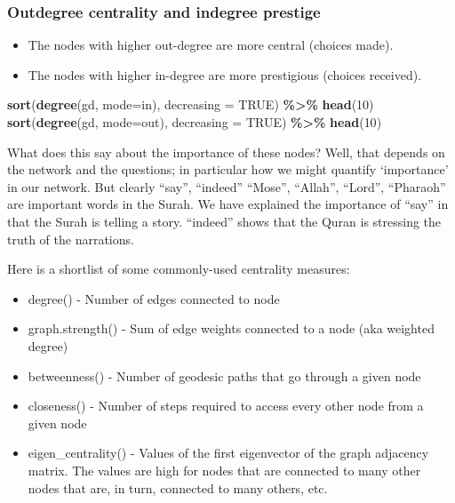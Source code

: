 \documentclass[
]{article}
\newenvironment{Shaded}{\begin{snugshade}}{\end{snugshade}}
\newcommand{\AttributeTok}[1]{\textcolor[rgb]{0.13,0.29,0.53}{#1}}
\newcommand{\ConstantTok}[1]{\textcolor[rgb]{0.56,0.35,0.01}{#1}}
\newcommand{\DecValTok}[1]{\textcolor[rgb]{0.00,0.00,0.81}{#1}}
\newcommand{\FunctionTok}[1]{\textcolor[rgb]{0.13,0.29,0.53}{\textbf{#1}}}
\newcommand{\NormalTok}[1]{#1}
\newcommand{\SpecialCharTok}[1]{\textcolor[rgb]{0.81,0.36,0.00}{\textbf{#1}}}
\newcommand{\StringTok}[1]{\textcolor[rgb]{0.31,0.60,0.02}{#1}}
\providecommand{\tightlist}{%
  \setlength{\itemsep}{0pt}\setlength{\parskip}{0pt}}
\begin{document}
\normalsize

\hypertarget{outdegree-centrality-and-indegree-prestige}{%
\subsubsection{Outdegree centrality and indegree prestige}\label{outdegree-centrality-and-indegree-prestige}}

\begin{itemize}
\tightlist
\item
  The nodes with higher out-degree are more central (choices made).
\item
  The nodes with higher in-degree are more prestigious (choices received).
\end{itemize}

\footnotesize

\begin{Shaded}
\begin{Highlighting}[]
\FunctionTok{sort}\NormalTok{(}\FunctionTok{degree}\NormalTok{(gd, }\AttributeTok{mode=}\StringTok{\textquotesingle{}in\textquotesingle{}}\NormalTok{), }\AttributeTok{decreasing =} \ConstantTok{TRUE}\NormalTok{) }\SpecialCharTok{\%\textgreater{}\%} \FunctionTok{head}\NormalTok{(}\DecValTok{10}\NormalTok{)}
\FunctionTok{sort}\NormalTok{(}\FunctionTok{degree}\NormalTok{(gd, }\AttributeTok{mode=}\StringTok{\textquotesingle{}out\textquotesingle{}}\NormalTok{), }\AttributeTok{decreasing =} \ConstantTok{TRUE}\NormalTok{) }\SpecialCharTok{\%\textgreater{}\%} \FunctionTok{head}\NormalTok{(}\DecValTok{10}\NormalTok{)}
\end{Highlighting}
\end{Shaded}

\normalsize

What does this say about the importance of these nodes? Well, that depends on the network and the questions; in particular how we might quantify `importance' in our network. But clearly ``say'', ``indeed'' ``Mose'', ``Allah'', ``Lord'', ``Pharaoh'' are important words in the Surah. We have explained the importance of ``say'' in that the Surah is telling a story. ``indeed'' shows that the Quran is stressing the truth of the narrations.

Here is a shortlist of some commonly-used centrality measures:

\begin{itemize}
\tightlist
\item
  degree() - Number of edges connected to node
\item
  graph.strength() - Sum of edge weights connected to a node (aka weighted degree)
\item
  betweenness() - Number of geodesic paths that go through a given node
\item
  closeness() - Number of steps required to access every other node from a given node
\item
  eigen\_centrality() - Values of the first eigenvector of the graph adjacency matrix. The values are high for nodes that are connected to many other nodes that are, in turn, connected to many others, etc.
\end{itemize}
\end{document}
